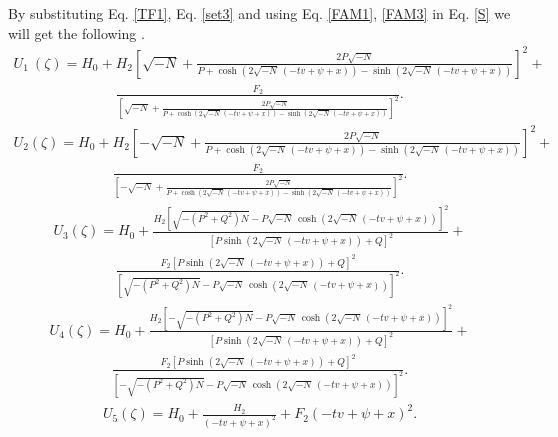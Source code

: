 \documentclass[10pt]{NSP1}
\numberwithin{equation}{section}
\begin{document}
By substituting Eq. \ref{TF1}, Eq. \ref{set3} and using Eq. \ref{FAM1}, \ref{FAM3} in Eq. \ref{S} we will get the following .\\
\begin{eqnarray}\label{U111}
U_{1}\ \left(\zeta \right) = H_{0}+H_{2} \left[\sqrt{-N}+\frac{2 P \sqrt{-N}}{P +\cosh \! \left(2 \sqrt{-N}\,
\left(-t v +\psi +x \right)\right)-\sinh \! \left(2 \sqrt{-N}\, \left(-t v +\psi +x \right)\right)}\right]^{2}+\nonumber
\end{eqnarray}
\begin{eqnarray}
\frac{F_{2}}{\left[\sqrt{-N}+\frac{2 P \sqrt{-N}}{P +\cosh \left(2 \sqrt{-N}\, \left(-t v +\psi +x \right)\right)-\sinh \left(2 \sqrt{-N}\,
\left(-t v +\psi +x \right)\right)}\right]^{2}}.
\end{eqnarray}
\begin{eqnarray}\label{U222}
U_{2}\! \left(\zeta \right) =
H_{0}+H_{2} \left[-\sqrt{-N}+\frac{2 P \sqrt{-N}}{P +\cosh \! \left(2 \sqrt{-N}\, \left(-t v +\psi +x \right)\right)-\sinh \! \left(2 \sqrt{-N}\, \left(-t v +\psi +x \right)\right)}\right]^{2}+\nonumber
\end{eqnarray}
\begin{eqnarray}
\frac{F_{2}}{\left[-\sqrt{-N}+\frac{2 P \sqrt{-N}}{P +\cosh \left(2 \sqrt{-N}\, \left(-t v +\psi +x \right)\right)-\sinh \left(2 \sqrt{-N}\, \left(-t v +\psi +x \right)\right)}\right]^{2}}.
\end{eqnarray}
\begin{eqnarray}\label{U333}
U_{3}\! \left(\zeta \right) =
H_{0}+\frac{H_{2} {\left[\sqrt{-\left(P^{2}+Q^{2}\right) N}-P \sqrt{-N}\, \cosh \! \left(2 \sqrt{-N}\, \left(-t v +\psi +x \right)\right)\right]}^{2}}{\left[P \sinh \! \left(2 \sqrt{-N}\, \left(-t v +\psi +x \right)\right)+Q \right]^{2}}+\nonumber
\end{eqnarray}
\begin{eqnarray}
\frac{F_{2} \left[P \sinh \! \left(2 \sqrt{-N}\, \left(-t v +\psi +x \right)\right)+Q \right]^{2}}{{\left[\sqrt{-\left(P^{2}+Q^{2}\right) N}-P \sqrt{-N}\, \cosh \! \left(2 \sqrt{-N}\, \left(-t v +\psi +x \right)\right)\right]}^{2}}.
\end{eqnarray}
\begin{eqnarray}\label{U444}
U_{4}\! \left(\zeta \right) =
H_{0}+\frac{H_{2} {\left[-\sqrt{-\left(P^{2}+Q^{2}\right) N}-P \sqrt{-N}\, \cosh \! \left(2 \sqrt{-N}\, \left(-t v +\psi +x \right)\right)\right]}^{2}}{\left[P \sinh \! \left(2 \sqrt{-N}\, \left(-t v +\psi +x \right)\right)+Q \right]^{2}}+\nonumber
\end{eqnarray}
\begin{eqnarray}
\frac{F_{2} \left[P \sinh \! \left(2 \sqrt{-N}\, \left(-t v +\psi +x \right)\right)+Q \right]^{2}}{{\left[-\sqrt{-\left(P^{2}+Q^{2}\right) N}-P \sqrt{-N}\, \cosh \! \left(2 \sqrt{-N}\, \left(-t v +\psi +x \right)\right)\right]}^{2}}.
\end{eqnarray}
\begin{eqnarray}\label{U555}
U_{5}\! \left(\zeta \right) =
H_{0}+\frac{H_{2}}{\left(-t v +\psi +x \right)^{2}}+F_{2} \left(-t v +\psi +x \right)^{2}.
\end{eqnarray}
\newpage
\FloatBarrier
\end{document}
